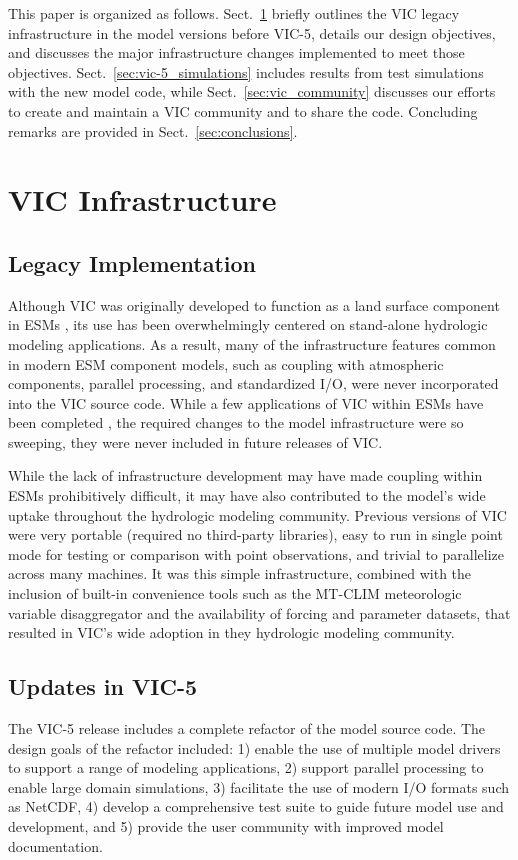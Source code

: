 \documentclass[gmd, manuscript]{copernicus}
\begin{document}
  This paper is organized as follows. Sect.~\ref{sec:vic_infrastructure} briefly outlines the VIC legacy infrastructure in the model versions before VIC-5, details our design objectives, and discusses the major infrastructure changes implemented to meet those objectives. Sect.~\ref{sec:vic-5_simulations} includes results from test simulations with the new model code, while Sect.~\ref{sec:vic_community} discusses our efforts to create and maintain a VIC community and to share the code. Concluding remarks are provided in Sect.~\ref{sec:conclusions}.

\section{VIC Infrastructure}
  \label{sec:vic_infrastructure}
  \subsection{Legacy Implementation}
    \label{sec:vic_legacy}

  Although VIC was originally developed to function as a land surface component in ESMs \citep{Liang_1994}, its use has been overwhelmingly centered on stand-alone hydrologic modeling applications. As a result, many of the infrastructure features common in modern ESM component models, such as coupling with atmospheric components, parallel processing, and  standardized I/O, were never incorporated into the VIC source code. While a few applications of VIC within ESMs have been completed \citep{Zhu_2009,Hamman_2016a}, the required changes to the model infrastructure were so sweeping, they were never included in future releases of VIC.

  While the lack of infrastructure development may have made coupling within ESMs prohibitively difficult, it may have also contributed to the model's wide uptake throughout the hydrologic modeling community. Previous versions of VIC were very portable (required no third-party libraries), easy to run in single point mode for testing or comparison with point observations, and trivial to parallelize across many machines. It was this simple infrastructure, combined with the inclusion of built-in convenience tools such as the MT-CLIM \citep{Thornton_1999,Bohn_2013} meteorologic variable disaggregator and the availability of forcing and parameter datasets, that resulted in VIC's wide adoption in they hydrologic modeling community.

  \subsection{Updates in VIC-5}
    \label{sec:vic-5}
    The VIC-5 release includes a complete refactor of the model source code. The design goals of the refactor included: 1) enable the use of multiple model drivers to support a range of modeling applications, 2) support parallel processing to enable large domain simulations, 3) facilitate the use of modern I/O formats such as NetCDF, 4) develop a comprehensive test suite to guide future model use and development, and 5) provide the user community with improved model documentation.
\end{document}
